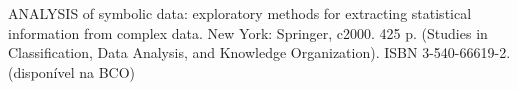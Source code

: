 {{        ANALYSIS of symbolic data: exploratory methods for extracting statistical information from complex data. New York: Springer, c2000. 425 p. (Studies in Classification, Data Analysis, and Knowledge Organization). ISBN 3-540-66619-2.(disponível na BCO)
    }

}